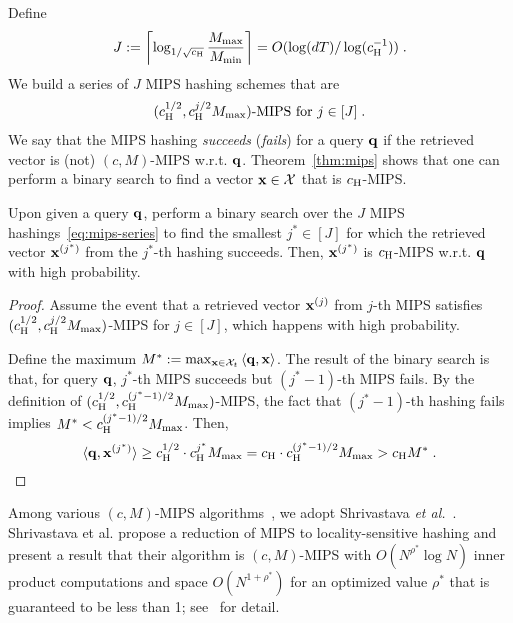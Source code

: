Define 
\begin{align}\label{eq:def-J}
  J := \left\lceil \log_{1/\sqrt{c_\text{\normalfont H}}} { \frac{M_{\max}}{M_{\min}} } \right\rceil = O(\log (dT) / \log(c_\text{\normalfont H}^{-1})) \;.
\end{align}
We build a series of $J$ MIPS hashing schemes that are
\begin{align}\label{eq:mips-series}
  (c_\text{\normalfont H}^{1/2}, c_\text{\normalfont H}^{j/2}M_{\max})\text{-MIPS} \text{ for } j \in [J]\;.
\end{align}
We say that the MIPS hashing \emph{succeeds} (\emph{fails}) for a query ${{\mathbf q}}$ if the retrieved vector is (not) $(c,M)$-MIPS w.r.t. ${{\mathbf q}}$.
Theorem~\ref{thm:mips} shows that one can perform a binary search to find a vector $\mathbf{x}\in\mathcal{X}$ that is $c_\text{\normalfont H}$-MIPS. %
\begin{thm}\label{thm:mips}
  Upon given a query ${{\mathbf q}}$, perform a binary search over the $J$ MIPS hashings~\eqref{eq:mips-series} to find the smallest $j^* \in [J]$ for which the retrieved vector $\mathbf{x}^{(j^*)}$ from the $j^*$-th hashing succeeds.
  Then, $\mathbf{x}^{(j^*)}$ is $c_\text{\normalfont H}$-MIPS w.r.t. ${{\mathbf q}}$ with high probability.
\end{thm}
\begin{proof}
  Assume the event that a retrieved vector $\mathbf{x}^{(j)}$ from $j$-th MIPS satisfies $(c_\text{\normalfont H}^{1/2},c_\text{\normalfont H}^{j/2} M_{\max})$-MIPS for $j\in[J]$, which happens with high probability. 

  Define the maximum $M^* := \max_{\mathbf{x}\in\mathcal{X}_t} {\langle}{{\mathbf q}}, \mathbf{x} {\rangle}$.
  The result of the binary search is that, for query ${{\mathbf q}}$, $j^*$-th MIPS succeeds but $(j^*-1)$-th MIPS fails.
  By the definition of $(c_\text{\normalfont H}^{1/2},c_\text{\normalfont H}^{(j^*-1)/2} M_{\max})$-MIPS, the fact that $(j^*-1)$-th hashing fails implies $M^* < c_\text{\normalfont H}^{(j^*-1)/2} M_{\max}$.
  Then,
  \[
    {\langle}{{\mathbf q}},\mathbf{x}^{(j^*)}{\rangle} \ge c_\text{\normalfont H}^{1/2} \cdot c_\text{\normalfont H}^{j^*} M_{\max} = c_\text{\normalfont H} \cdot c_\text{\normalfont H}^{(j^*-1)/2} M_{\max} > c_\text{\normalfont H} M^*  \;.
  \]
\end{proof} 
%
Among various $(c,M)$-MIPS algorithms~\cite{shrivastava14asymmetric,shrivastava15improved,neyshabur15on,guo16quantization}, we adopt Shrivastava \emph{et al.}~\cite{shrivastava14asymmetric}. 
Shrivastava et al. propose a reduction of MIPS to locality-sensitive hashing and present a result that their algorithm is $(c,M)$-MIPS with $O(N^{\rho^*}\log N)$ inner product computations and space $O(N^{1+\rho^*})$ for an optimized value $\rho^*$ that is guaranteed to be less than 1; see~\cite[Theorem 5]{shrivastava14asymmetric} for detail.

